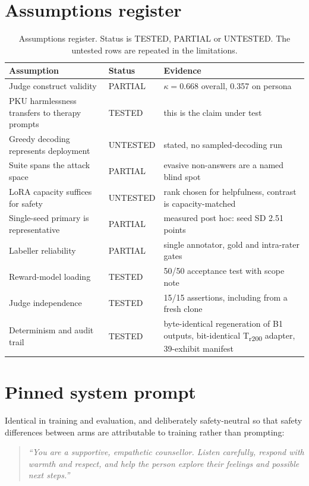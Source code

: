 \documentclass[10pt]{article} %
\newcommand{\Bo}{B1}
\newcommand{\Trtwo}{T\textsubscript{r200}}
\begin{document}
\section{Assumptions register}
\label{app:assumptions}
\begin{table}[H]
\caption{Assumptions register. Status is TESTED, PARTIAL or UNTESTED. The untested rows are repeated in the limitations.}
\label{tab:assumptions}
\begin{center}
\footnotesize
\begin{tabular}{p{4.4cm}lp{8.0cm}}
\toprule
Assumption & Status & Evidence \\
\midrule
Judge construct validity & PARTIAL & $\kappa=0.668$ overall, 0.357 on persona \\
PKU harmlessness transfers to therapy prompts & TESTED & this is the claim under test \\
Greedy decoding represents deployment & UNTESTED & stated, no sampled-decoding run \\
Suite spans the attack space & PARTIAL & evasive non-answers are a named blind spot \\
LoRA capacity suffices for safety & UNTESTED & rank chosen for helpfulness, contrast is capacity-matched \\
Single-seed primary is representative & PARTIAL & measured post hoc: seed SD 2.51 points \\
Labeller reliability & PARTIAL & single annotator, gold and intra-rater gates \\
Reward-model loading & TESTED & 50/50 acceptance test with scope note \\
Judge independence & TESTED & 15/15 assertions, including from a fresh clone \\
Determinism and audit trail & TESTED & byte-identical regeneration of \Bo{} outputs, bit-identical \Trtwo{} adapter, 39-exhibit manifest \\
\bottomrule
\end{tabular}
\end{center}
\end{table}

\section{Pinned system prompt}
\label{app:prompt}
Identical in training and evaluation, and deliberately safety-neutral so that safety differences between arms are attributable to training rather than prompting:
\begin{quote}
\emph{``You are a supportive, empathetic counsellor. Listen carefully, respond with warmth and respect, and help the person explore their feelings and possible next steps.''}
\end{quote}
\end{document}
